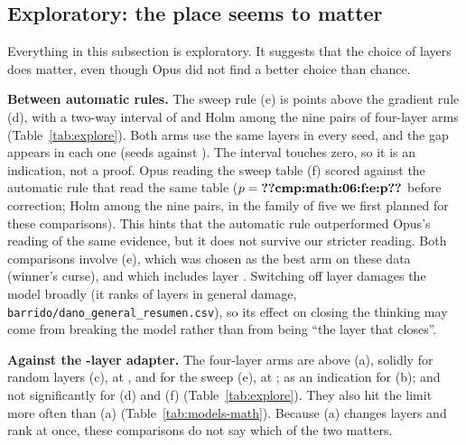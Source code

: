 \documentclass[11pt]{article}
\newcommand{\fitwidth}[1]{\resizebox{\ifdim\width>\linewidth\linewidth\else\width\fi}{!}{#1}}
\begin{document}
\begin{table}[htbp]
\centering
\caption{GSM8K and IFEval: each arm against the no-thinking original (pre-specified) and against \texttt{p50c} (exploratory). Differences with two-way 95\% intervals; Holm within the family of six arms per task and reference. $^{\dagger}$solid, $^{\ast}$indication (\S\ref{sec:3.6}). Source: \texttt{revision/rev\_comparaciones.csv}, \texttt{revision/rev\_holm.csv}.}\label{tab:cmp-transfer}
\footnotesize\setlength{\tabcolsep}{3pt}
\fitwidth{}
\end{table}

\subsection{Exploratory: the place seems to matter}\label{sec:4.5}

Everything in this subsection is exploratory. It suggests that the choice of layers does matter, even though Opus did not find a better choice than chance.

\textbf{Between automatic rules.} The sweep rule (e) is  points above the gradient rule (d), with a two-way interval of  and Holm  among the nine pairs of four-layer arms (Table~\ref{tab:explore}). Both arms use the same layers in every seed, and the gap appears in each one (seeds  against ). The interval touches zero, so it is an indication, not a proof. Opus reading the sweep table (f) scored   against the automatic rule that read the same table ($p=\R{cmp:math:06:f:e:p}$ before correction; Holm  among the nine pairs,  in the family of five we first planned for these comparisons). This hints that the automatic rule outperformed Opus's reading of the same evidence, but it does not survive our stricter reading. Both comparisons involve (e), which was chosen as the best arm on these data (winner's curse), and which includes layer . Switching off layer  damages the model broadly (it ranks  of \NModelLayers{} layers in general damage, \texttt{barrido/dano\_general\_resumen.csv}), so its effect on closing the thinking may come from breaking the model rather than from being ``the layer that closes''.

\textbf{Against the \NLayersFull{}-layer adapter.} The four-layer arms are above (a), solidly for random layers (c), at  , and for the sweep (e), at  ; as an indication for (b); and not significantly for (d) and (f) (Table~\ref{tab:explore}). They also hit the limit more often than (a) (Table~\ref{tab:models-math}). Because (a) changes layers and rank at once, these comparisons do not say which of the two matters.
\end{document}
